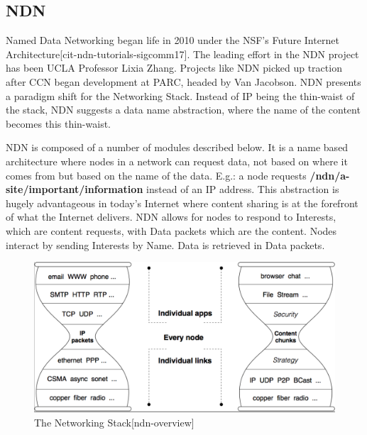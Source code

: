\subsection{NDN}
Named Data Networking began life in 2010 under the NSF's Future Internet Architecture[cit-ndn-tutorials-sigcomm17]. The leading effort in the NDN project has been UCLA Professor Lixia Zhang. Projects like NDN picked up traction after CCN began development at PARC, headed by Van Jacobson. NDN presents a paradigm shift for the Networking Stack. Instead of IP being the thin-waist of the stack, NDN suggests a data name abstraction, where the name of the content becomes this thin-waist. \par
NDN is composed of a number of modules described below. It is a name based architecture where nodes in a network can request data, not based on where it comes from but based on the name of the data. E.g.: a node requests \textbf{/ndn/a-site/important/information} instead of an IP address. This abstraction is hugely advantageous in today's Internet where content sharing is at the forefront of what the Internet delivers. NDN allows for nodes to respond to Interests, which are content requests, with Data packets which are the content. Nodes interact by sending Interests by Name. Data is retrieved in Data packets.\par 
\begin{figure}[h]
\includegraphics[width=6in]{hourglass.png}
\caption{The Networking Stack[ndn-overview]}
\end{figure}

